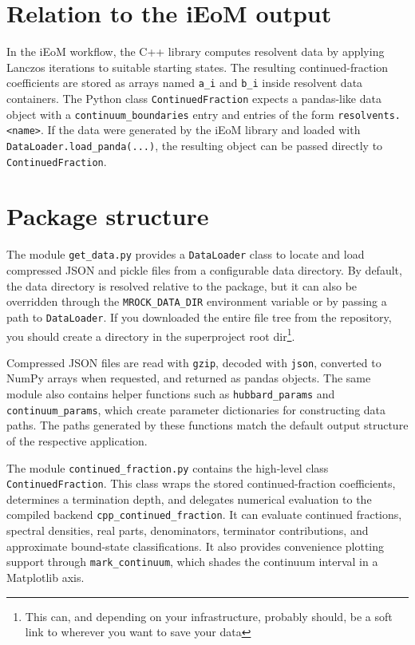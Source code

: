\documentclass[11pt]{article}
\newcommand{\code}[1]{%
  \texttt{\detokenize{#1}}%
}
\begin{document}
\section{Relation to the iEoM output}

In the iEoM workflow, the C++ library computes resolvent data by applying Lanczos iterations to suitable starting states. 
The resulting continued-fraction coefficients are stored as arrays named \texttt{a\_i} and \texttt{b\_i} inside resolvent data containers. 
The Python class \texttt{ContinuedFraction} expects a pandas-like data object with a \texttt{continuum\_boundaries} entry and entries of the form \texttt{resolvents.<name>}. 
If the data were generated by the iEoM library and loaded with \texttt{DataLoader.load\_panda(...)}, the resulting object can be passed directly to \texttt{ContinuedFraction}.

\section{Package structure}

The module \texttt{get\_data.py} provides a \texttt{DataLoader} class to locate and load compressed JSON and pickle files from a configurable data directory. 
By default, the data directory is resolved relative to the package, but it can also be overridden through the \texttt{MROCK\_DATA\_DIR} environment variable or by passing a path to \texttt{DataLoader}.
If you downloaded the entire file tree from the repository, you should create a \code{data} directory in the superproject root dir\footnote{This can, and depending on your infrastructure, probably should, be a soft link to wherever you want to save your data}.

Compressed JSON files are read with \texttt{gzip}, decoded with \texttt{json}, converted to NumPy arrays when requested, and returned as pandas objects. 
The same module also contains helper functions such as \texttt{hubbard\_params} and \texttt{continuum\_params}, which create parameter dictionaries for constructing data paths. 
The paths generated by these functions match the default output structure of the respective application.

The module \texttt{continued\_fraction.py} contains the high-level class \texttt{ContinuedFraction}. 
This class wraps the stored continued-fraction coefficients, determines a termination depth, and delegates numerical evaluation to the compiled backend \texttt{cpp\_continued\_fraction}. 
It can evaluate continued fractions, spectral densities, real parts, denominators, terminator contributions, and approximate bound-state classifications. 
It also provides convenience plotting support through \texttt{mark\_continuum}, which shades the continuum interval in a Matplotlib axis. 
\end{document}
